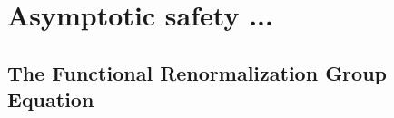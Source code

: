 \documentclass[11pt, a4paper]{article}
\begin{document}


\section{Asymptotic safety ...}

\subsection{The Functional Renormalization Group Equation}


\end{document}
